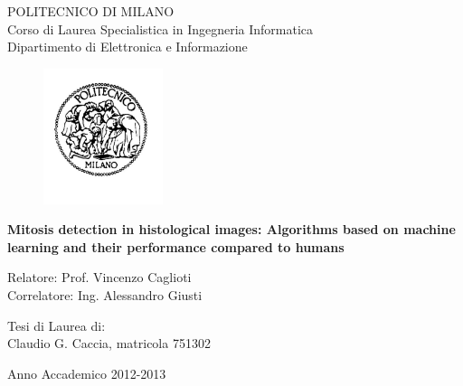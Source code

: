 \thispagestyle{empty}
\vspace*{-1.5cm}
\bfseries{
	\begin{center}
		\large
		POLITECNICO DI MILANO\\
		\normalsize
		Corso di Laurea Specialistica in Ingegneria Informatica\\
		Dipartimento di Elettronica e Informazione\\
		\begin{figure}[htbp]
			\begin{center}
				\includegraphics[width=3.5cm]{./images/logopm}
			\end{center}
		\end{figure}
		
		\vspace*{0.5cm} \LARGE
		
		\textbf{Mitosis detection in histological images:  Algorithms based on machine learning and their performance compared to humans}\\
		
		\vspace*{.5truecm} \large
		
	\end{center}
	
	\vspace*{2.0cm} \large
	
	\begin{flushleft}
		Relatore: Prof. Vincenzo Caglioti \\
		Correlatore: Ing. Alessandro Giusti
	\end{flushleft}
	
	\vspace*{1.25cm}
	
	\begin{flushright}
		Tesi di Laurea di:\\ Claudio G. Caccia, matricola 751302 \\
	\end{flushright}
	
	\vspace*{2.0cm}
	
	\begin{center}
		Anno Accademico 2012-2013
	\end{center} \clearpage
}
